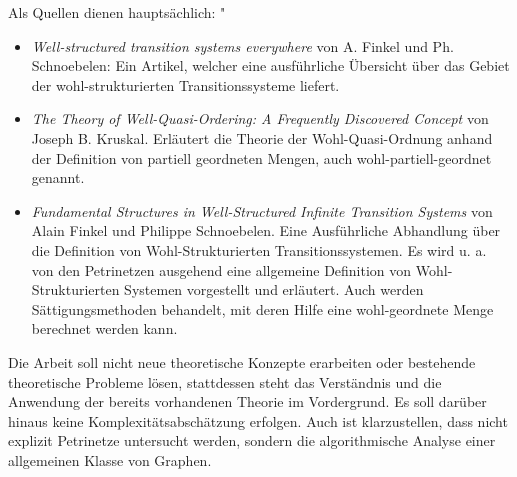 \documentclass[
  a4paper,               %
  twoside,               %
  headings=small,        %
  DIV=12,                %
  BCOR=1cm,              %
  headinclude=true,      %
  footinclude=true,      %
  numbers=noenddot,      %
  11pt]{scrartcl}        %
\begin{document}
Als Quellen dienen hauptsächlich:
"\begin{itemize}
  \item \emph{{\glqq}Well-structured transition systems everywhere{\grqq}} von A. Finkel und Ph. Schnoebelen:
  Ein Artikel, welcher eine ausführliche Übersicht über das Gebiet der wohl-strukturierten Transitionssysteme liefert.
  \item \emph{{\glqq}The Theory of Well-Quasi-Ordering: A Frequently Discovered Concept{\grqq}} von Joseph B. Kruskal. Erläutert die Theorie der Wohl-Quasi-Ordnung anhand der Definition von partiell geordneten Mengen, auch wohl-partiell-geordnet genannt.
  \item \emph{{\glqq}Fundamental Structures in Well-Structured Infinite Transition Systems{\grqq}} von Alain Finkel und Philippe Schnoebelen. Eine Ausführliche Abhandlung über die Definition von Wohl-Strukturierten Transitionssystemen. Es wird u. a. von den Petrinetzen ausgehend eine allgemeine Definition von Wohl-Strukturierten Systemen vorgestellt und erläutert. Auch werden Sättigungsmethoden behandelt, mit deren Hilfe eine wohl-geordnete Menge berechnet werden kann.
\end{itemize}

Die Arbeit soll nicht neue theoretische Konzepte erarbeiten oder bestehende theoretische Probleme lösen, stattdessen steht das Verständnis und die Anwendung der bereits vorhandenen Theorie im Vordergrund. Es soll darüber hinaus keine Komplexitätsabschätzung erfolgen. Auch ist klarzustellen, dass nicht explizit Petrinetze untersucht werden, sondern die algorithmische Analyse einer allgemeinen Klasse von Graphen.
\end{document}
